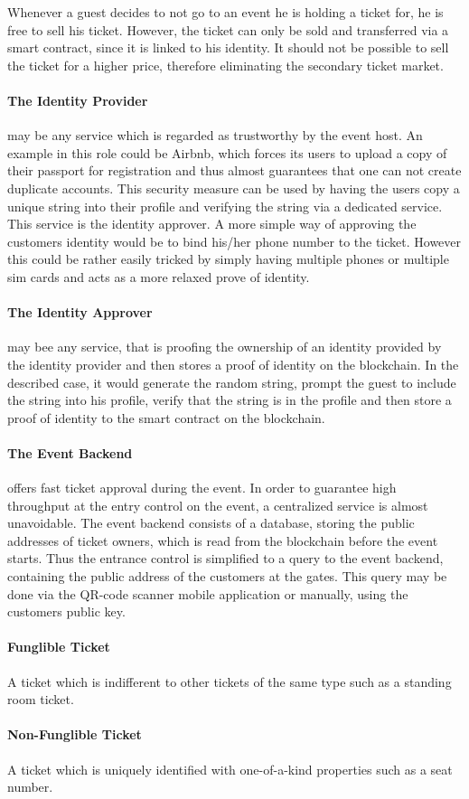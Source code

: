 
Whenever a guest decides to not go to an event he is holding a ticket for, he is free to sell his ticket. However, the ticket can only be sold and transferred via a smart contract, since it is linked to his identity. It should not be possible to sell the ticket for a higher price, therefore eliminating the secondary ticket market.

\paragraph{The Identity Provider} may be any service which is regarded as trustworthy by the event host. An example in this role could be Airbnb, which forces its users to upload a copy of their passport for registration and thus almost guarantees that one can not create duplicate accounts. This security measure can be used by having the users copy a unique string into their profile and verifying the string via a dedicated service. This service is the identity approver. A more simple way of approving the customers identity would be to bind his/her phone number to the ticket. However this could be rather easily tricked by simply having multiple phones or multiple sim cards and acts as a more relaxed prove of identity.

\paragraph{The Identity Approver} may bee any service, that is proofing the ownership of an identity provided by the identity provider and then stores a proof of identity on the blockchain. In the described case, it would generate the random string, prompt the guest to include the string into his profile, verify that the string is in the profile and then store a proof of identity to the smart contract on the blockchain.

\paragraph{The Event Backend} offers fast ticket approval during the event. In order to guarantee high throughput at the entry control on the event, a centralized service is almost unavoidable. The event backend consists of a database, storing the public addresses of ticket owners, which is read from the blockchain before the event starts. Thus the entrance control is simplified to a query to the event backend, containing the public address of the customers at the gates. This query may be done via the QR-code scanner mobile application or manually, using the customers public key.

\paragraph{Funglible Ticket}A ticket which is indifferent to other tickets of the same type such as a standing room ticket.

\paragraph{Non-Funglible Ticket}A ticket which is uniquely identified with one-of-a-kind properties such as a seat number.
